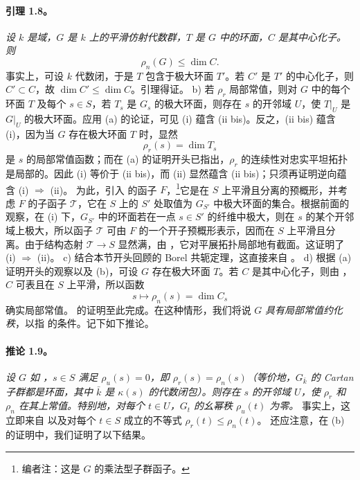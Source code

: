 \paragraph{\textbf{引理 1.8。}}
\emph{设 \(k\) 是域，\(G\) 是 \(k\) 上的平滑仿射代数群，\(T\) 是 \(G\) 中的环面，\(C\) 是其中心化子。则}
\[
  \rho_n(G)\leq \dim C.
\]
事实上，可设 \(k\) 代数闭，于是 \(T\) 包含于极大环面 \(T'\)。若 \(C'\) 是 \(T'\) 的中心化子，则 \(C'\subset C\)，故 \(\dim C'\leq \dim C\)。引理得证。
b) 若 \(\rho_r\) 局部常值，则对 \(G\) 中的每个环面 \(T\) 及每个 \(s\in S\)，若 \(T_s\) 是 \(G_s\) 的极大环面，则存在 \(s\) 的开邻域 \(U\)，使 \(T|_U\) 是 \(G|_U\) 的极大环面。应用 (a) 的论证，可见 (i) 蕴含 (ii bis)。反之，(ii bis) 蕴含 (i)，因为当 \(G\) 存在极大环面 \(T\) 时，显然
\[
  \rho_r(s)=\dim T_s
\]
是 \(s\) 的局部常值函数；而在 (a) 的证明开头已指出，\(\rho_r\) 的连续性对忠实平坦拓扑是局部的。因此 (i) 等价于 (ii bis)，而 (ii) 显然蕴含 (ii bis)；只须再证明逆向蕴含 (i) \(\Rightarrow\) (ii)。
为此，引入  的函子 \(F\)，\footnote{编者注：这是 \(G\) 的乘法型子群函子。}它是在 \(S\) 上平滑且分离的预概形，并考虑 \(F\) 的子函子 \(\mathcal T\)，它在 \(S\) 上的 \(S'\) 处取值为 \(G_{S'}\) 中极大环面的集合。根据前面的观察，在 (i) 下，\(G_{S'}\) 中的环面若在一点 \(s\in S'\) 的纤维中极大，则在 \(s\) 的某个开邻域上极大，所以函子 \(\mathcal T\) 可由 \(F\) 的一个开子预概形表示，因而在 \(S\) 上平滑且分离。由于结构态射 \(\mathcal T\to S\) 显然满，由 ，它对平展拓扑局部地有截面。这证明了 (i) \(\Rightarrow\) (ii)。
c) 结合本节开头回顾的 Borel 共轭定理，这直接来自 。
d) 根据 (a) 证明开头的观察以及 (b)，可设 \(G\) 存在极大环面 \(T\)。若 \(C\) 是其中心化子，则由 ，\(C\) 可表且在 \(S\) 上平滑，所以函数
\[
  s\longmapsto \rho_n(s)=\dim C_s
\]
确实局部常值。
 的证明至此完成。在这种情形，我们将说 \(G\) \emph{具有局部常值约化秩}，以指  的条件。记下如下推论。
\paragraph{\textbf{推论 1.9。}}
\emph{设 \(G\) 如 ，\(s\in S\) 满足 \(\rho_u(s)=0\)，即 \(\rho_r(s)=\rho_n(s)\)（等价地，\(G_{\bar k}\) 的 Cartan 子群都是环面，其中 \(\bar k\) 是 \(\kappa(s)\) 的代数闭包）。则存在 \(s\) 的开邻域 \(U\)，使 \(\rho_r\) 和 \(\rho_n\) 在其上常值。特别地，对每个 \(t\in U\)，\(G_t\) 的幺幂秩 \(\rho_u(t)\) 为零。}
事实上，这立即来自  以及对每个 \(t\in S\) 成立的不等式 \(\rho_r(t)\leq \rho_n(t)\)。
还应注意，在 (b) 的证明中，我们证明了以下结果。
